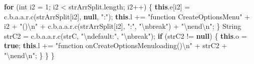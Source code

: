 \documentclass[
]{article}
\newenvironment{Shaded}{}{}
\newcommand{\BuiltInTok}[1]{\textcolor[rgb]{0.00,0.50,0.00}{#1}}
\newcommand{\ControlFlowTok}[1]{\textcolor[rgb]{0.00,0.44,0.13}{\textbf{#1}}}
\newcommand{\DataTypeTok}[1]{\textcolor[rgb]{0.56,0.13,0.00}{#1}}
\newcommand{\DecValTok}[1]{\textcolor[rgb]{0.25,0.63,0.44}{#1}}
\newcommand{\FunctionTok}[1]{\textcolor[rgb]{0.02,0.16,0.49}{#1}}
\newcommand{\KeywordTok}[1]{\textcolor[rgb]{0.00,0.44,0.13}{\textbf{#1}}}
\newcommand{\NormalTok}[1]{#1}
\newcommand{\OperatorTok}[1]{\textcolor[rgb]{0.40,0.40,0.40}{#1}}
\newcommand{\SpecialCharTok}[1]{\textcolor[rgb]{0.25,0.44,0.63}{#1}}
\newcommand{\StringTok}[1]{\textcolor[rgb]{0.25,0.44,0.63}{#1}}
\begin{document}
\begin{Shaded}
\begin{Highlighting}[]
            \ControlFlowTok{for} \OperatorTok{(}\DataTypeTok{int}\NormalTok{ i2 }\OperatorTok{=} \DecValTok{1}\OperatorTok{;}\NormalTok{ i2 }\OperatorTok{\textless{}}\NormalTok{ strArrSplit}\OperatorTok{.}\FunctionTok{length}\OperatorTok{;}\NormalTok{ i2}\OperatorTok{++)} \OperatorTok{\{}
                \KeywordTok{this}\OperatorTok{.}\FunctionTok{e}\OperatorTok{[}\NormalTok{i2}\OperatorTok{]} \OperatorTok{=}\NormalTok{ c}\OperatorTok{.}\FunctionTok{b}\OperatorTok{.}\FunctionTok{a}\OperatorTok{.}\FunctionTok{a}\OperatorTok{.}\FunctionTok{r}\OperatorTok{.}\FunctionTok{c}\OperatorTok{(}\NormalTok{strArrSplit}\OperatorTok{[}\NormalTok{i2}\OperatorTok{],} \KeywordTok{null}\OperatorTok{,} \StringTok{":"}\OperatorTok{);}
                \KeywordTok{this}\OperatorTok{.}\FunctionTok{l} \OperatorTok{+=} \StringTok{"function CreateOptionsMenu"} \OperatorTok{+}\NormalTok{ i2 }\OperatorTok{+} \StringTok{"()}\SpecialCharTok{\textbackslash{}n}\StringTok{"} \OperatorTok{+}\NormalTok{ c}\OperatorTok{.}\FunctionTok{b}\OperatorTok{.}\FunctionTok{a}\OperatorTok{.}\FunctionTok{a}\OperatorTok{.}\FunctionTok{r}\OperatorTok{.}\FunctionTok{c}\OperatorTok{(}\NormalTok{strArrSplit}\OperatorTok{[}\NormalTok{i2}\OperatorTok{],} \StringTok{":"}\OperatorTok{,} \StringTok{"}\SpecialCharTok{\textbackslash{}n}\StringTok{break"}\OperatorTok{)} \OperatorTok{+} \StringTok{"}\SpecialCharTok{\textbackslash{}n}\StringTok{end}\SpecialCharTok{\textbackslash{}n}\StringTok{"}\OperatorTok{;}
            \OperatorTok{\}}
            \BuiltInTok{String}\NormalTok{ strC2 }\OperatorTok{=}\NormalTok{ c}\OperatorTok{.}\FunctionTok{b}\OperatorTok{.}\FunctionTok{a}\OperatorTok{.}\FunctionTok{a}\OperatorTok{.}\FunctionTok{r}\OperatorTok{.}\FunctionTok{c}\OperatorTok{(}\NormalTok{strC}\OperatorTok{,} \StringTok{"}\SpecialCharTok{\textbackslash{}n}\StringTok{default:"}\OperatorTok{,} \StringTok{"}\SpecialCharTok{\textbackslash{}n}\StringTok{break"}\OperatorTok{);}
            \ControlFlowTok{if} \OperatorTok{(}\NormalTok{strC2 }\OperatorTok{!=} \KeywordTok{null}\OperatorTok{)} \OperatorTok{\{}
                \KeywordTok{this}\OperatorTok{.}\FunctionTok{o} \OperatorTok{=} \KeywordTok{true}\OperatorTok{;}
                \KeywordTok{this}\OperatorTok{.}\FunctionTok{l} \OperatorTok{+=} \StringTok{"function onCreateOptionsMenuloading()}\SpecialCharTok{\textbackslash{}n}\StringTok{"} \OperatorTok{+}\NormalTok{ strC2 }\OperatorTok{+} \StringTok{"}\SpecialCharTok{\textbackslash{}n}\StringTok{end}\SpecialCharTok{\textbackslash{}n}\StringTok{"}\OperatorTok{;}
            \OperatorTok{\}}
        \OperatorTok{\}}
    \OperatorTok{\}}


\end{Highlighting}
\end{Shaded}
\end{document}
